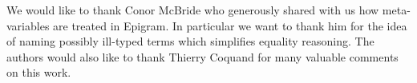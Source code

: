 We would like to thank Conor McBride who generously shared with us how
meta-variables are treated in Epigram. In particular we want to thank him for the
idea of naming possibly ill-typed terms which simplifies equality reasoning.
The authors would also like to thank Thierry Coquand for many valuable comments
on this work.


